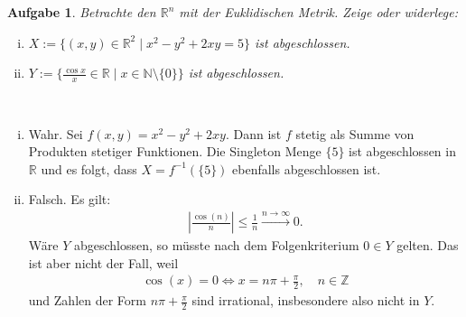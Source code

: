 \documentclass[a4paper, 20]{exam}
\newtheorem{ex}{Aufgabe}
\begin{document}
\begin{ex} Betrachte den $\mathbb{R}^n$ mit der Euklidischen Metrik. Zeige oder widerlege:
\begin{enumerate}[i)]
\item $X:= \{(x,y) \in \mathbb{R}^2 \mid x^2-y^2+2xy=5\}$ ist abgeschlossen. 
\item $Y:= \{ \frac{\cos x}{x} \in \mathbb{R} \mid x \in \mathbb{N} \setminus \{0\}\} $ ist abgeschlossen. 
\end{enumerate}
\end{ex}


\begin{solution} \
\begin{enumerate}[i)]
\item Wahr. Sei $f(x,y)=x^2-y^2+2xy$. Dann ist $f$ stetig als Summe von Produkten stetiger Funktionen. Die Singleton Menge $\{5\}$ ist abgeschlossen in $\mathbb{R}$ und es folgt, dass $X= f^{-1}(\{5\})$ ebenfalls abgeschlossen ist. 
\item Falsch. Es gilt:
\begin{align*}
\left| \frac{\cos (n)}{n} \right| \leq \frac{1}{n} \xrightarrow{n \to \infty} 0.
\end{align*}
Wäre $Y$ abgeschlossen, so müsste nach dem Folgenkriterium $0 \in Y$ gelten. Das ist aber nicht der Fall, weil 
\begin{align*}
\cos (x)=0 \iff x = n \pi + \frac{\pi}{2}, \quad n \in \mathbb{Z}
\end{align*}
und Zahlen der Form $n \pi + \frac{\pi}{2}$ sind irrational, insbesondere also nicht in $Y$. 
\end{enumerate}
\end{solution}
\end{document}
